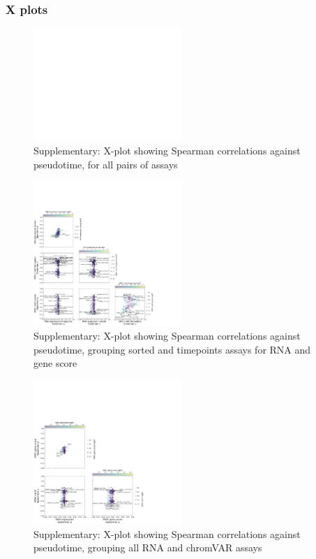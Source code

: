 \documentclass[a4paper]{article}
\begin{document}
\FloatBarrier
\subsubsection{X plots}
 
\begin{figure}[!htb]
  \centering
  \includegraphics[width=0.5\textwidth]{../figures/hematopoiesis/Basophil_40_109_smooth_none_detailed_X_plot.png}
  \caption{Supplementary: X-plot showing Spearman correlations against pseudotime, for all pairs of assays}
\end{figure}

\begin{figure}[!htb]
  \centering
  \includegraphics[width=0.5\textwidth]{../figures/hematopoiesis/Basophil_40_109_smooth_none_semi_detailed_X_plot.png}
  \caption{Supplementary: X-plot showing Spearman correlations against pseudotime, grouping sorted and timepoints assays for RNA and gene score}
\end{figure}

\begin{figure}[!htb]
  \centering
  \includegraphics[width=0.5\textwidth]{../figures/hematopoiesis/Basophil_40_109_smooth_none_grouped_X_plot.png}
  \caption{Supplementary: X-plot showing Spearman correlations against pseudotime, grouping all RNA and chromVAR assays}
\end{figure}
\end{document}
